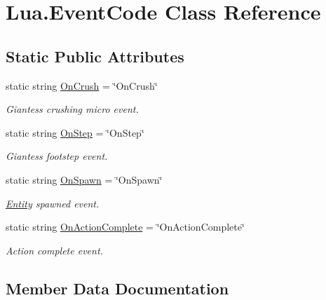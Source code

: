 \hypertarget{class_lua_1_1_event_code}{}\section{Lua.\+Event\+Code Class Reference}
\label{class_lua_1_1_event_code}
\subsection*{Static Public Attributes}
\begin{DoxyCompactItemize}
\item 
static string \hyperlink{class_lua_1_1_event_code_af0028cf602b24a1865397d0cf1df1623}{On\+Crush} = \char`\"{}On\+Crush\char`\"{}
\begin{DoxyCompactList}\small\item\em Giantess crushing micro event. \end{DoxyCompactList}\item 
static string \hyperlink{class_lua_1_1_event_code_adba8e0cdbec45f5694b0be4ea1fbfe7a}{On\+Step} = \char`\"{}On\+Step\char`\"{}
\begin{DoxyCompactList}\small\item\em Giantess footstep event. \end{DoxyCompactList}\item 
static string \hyperlink{class_lua_1_1_event_code_a30395eacc4a00fc49a4311b95d23727d}{On\+Spawn} = \char`\"{}On\+Spawn\char`\"{}
\begin{DoxyCompactList}\small\item\em \hyperlink{class_lua_1_1_entity}{Entity} spawned event. \end{DoxyCompactList}\item 
static string \hyperlink{class_lua_1_1_event_code_a48f2f42f01d3d763b55233e1e9c1047c}{On\+Action\+Complete} = \char`\"{}On\+Action\+Complete\char`\"{}
\begin{DoxyCompactList}\small\item\em Action complete event. \end{DoxyCompactList}\end{DoxyCompactItemize}


\subsection{Member Data Documentation}
\mbox{\label{class_lua_1_1_event_code_a48f2f42f01d3d763b55233e1e9c1047c}} 
